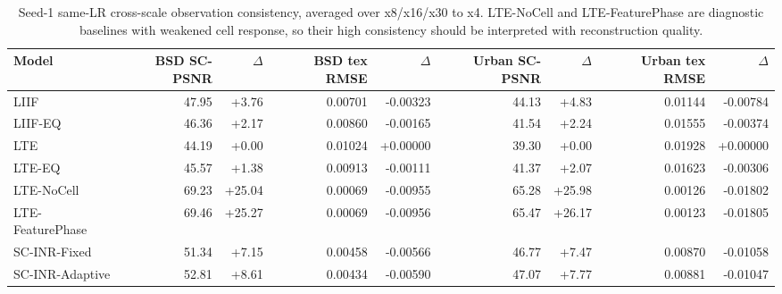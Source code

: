 \begin{table}[t]
\centering
\small
\caption{Seed-1 same-LR cross-scale observation consistency, averaged over x8/x16/x30 to x4. LTE-NoCell and LTE-FeaturePhase are diagnostic baselines with weakened cell response, so their high consistency should be interpreted with reconstruction quality.}
\label{tab:seed1_aux_consistency}
\begin{tabular}{lrrrrrrrr}
\toprule
Model & BSD SC-PSNR & $\Delta$ & BSD tex RMSE & $\Delta$ & Urban SC-PSNR & $\Delta$ & Urban tex RMSE & $\Delta$ \\
\midrule
LIIF & 47.95 & +3.76 & 0.00701 & -0.00323 & 44.13 & +4.83 & 0.01144 & -0.00784 \\
LIIF-EQ & 46.36 & +2.17 & 0.00860 & -0.00165 & 41.54 & +2.24 & 0.01555 & -0.00374 \\
LTE & 44.19 & +0.00 & 0.01024 & +0.00000 & 39.30 & +0.00 & 0.01928 & +0.00000 \\
LTE-EQ & 45.57 & +1.38 & 0.00913 & -0.00111 & 41.37 & +2.07 & 0.01623 & -0.00306 \\
LTE-NoCell & 69.23 & +25.04 & 0.00069 & -0.00955 & 65.28 & +25.98 & 0.00126 & -0.01802 \\
LTE-FeaturePhase & 69.46 & +25.27 & 0.00069 & -0.00956 & 65.47 & +26.17 & 0.00123 & -0.01805 \\
SC-INR-Fixed & 51.34 & +7.15 & 0.00458 & -0.00566 & 46.77 & +7.47 & 0.00870 & -0.01058 \\
SC-INR-Adaptive & 52.81 & +8.61 & 0.00434 & -0.00590 & 47.07 & +7.77 & 0.00881 & -0.01047 \\
\bottomrule
\end{tabular}
\end{table}
